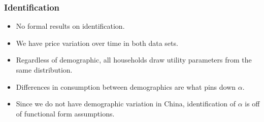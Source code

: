 \documentclass{beamer}
\begin{document}
\begin{frame}
  \frametitle{Identification}
  \begin{itemize}
    \item No formal results on identification.
    \item We have price variation over time in both data sets.
    \item Regardless of demographic, all households draw utility parameters from the same distribution.  
    \item Differences in consumption between demographics are what pins down $\alpha$.
    \item Since we do not have demographic variation in China, identification of $\alpha$ is off of functional form assumptions.
  \end{itemize}
\end{frame}
%
\end{document}
